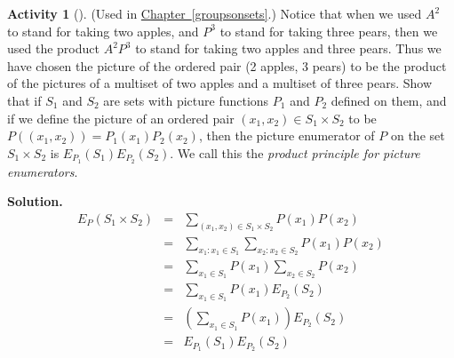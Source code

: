 \documentclass[10pt,]{book}
\theoremstyle{plain}
\theoremstyle{definition}
\newtheorem{activity}[project]{Activity}
\numberwithin{equation}{chapter}
\newcommand{\amp}{&}
\begin{document}
\begin{activity}[]\label{activity-155}
(Used in \hyperref[groupsonsets]{Chapter~\ref{groupsonsets}}.) Notice that when we used \(A^2\) to stand for taking two apples, and \(P^3\) to stand for taking three pears, then we used the product \(A^2P^3\) to stand for taking two apples and three pears. Thus we have chosen the picture of the ordered pair (2 apples, 3 pears) to be the product of the pictures of a multiset of two apples and a multiset of three pears. Show that if \(S_1\) and \(S_2\) are sets with picture functions \(P_1\) and \(P_2\) defined on them, and if we define the picture of an ordered pair \((x_1,x_2)\in S_1\times S_2\) to be \(P((x_1,x_2))= P_1(x_1)P_2(x_2)\), then the picture enumerator of \(P\) on the set \(S_1\times S_2\) is \(E_{P_1}(S_1)E_{P_2}(S_2)\). We call this the \emph{product principle for picture enumerators}.%
\par\medskip\noindent%
\textbf{Solution.}\quad %
\begin{align*}
E_P(S_1\times S_2)\amp =\amp \sum_{(x_1,x_2)\in S_1\times
S_2} P(x_1)P(x_2)\\
\amp =\amp
\sum_{x_1:x_1\in S_1}\sum_{x_2:x_2\in S_2} P(x_1)P(x_2)\\
\amp =\amp \sum_{x_1\in S_1}P(x_1)\sum_{x_2\in S_2}P(x_2)\\
\amp =\amp \sum_{x_1\in S_1} P(x_1) E_{P_2}(S_2)\\
\amp =\amp \left(\sum_{x_1\in S_1} P(x_1)\right)E_{P_2}(S_2)\\
\amp =\amp E_{P_1}(S_1)E_{P_2}(S_2)
\end{align*}
%
\end{activity}
\typeout{************************************************}
\typeout{************************************************}
\end{document}
